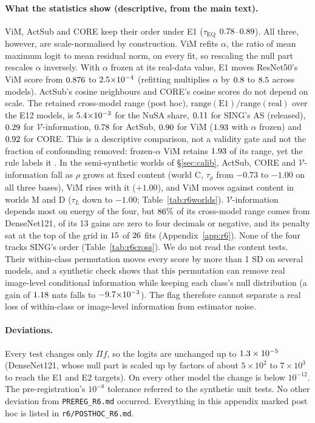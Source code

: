 \documentclass[10pt]{article}
\begin{document}
\paragraph{What the statistics show (descriptive, from the main text).}
ViM, ActSub and CORE keep their order under E1 ($\tau_{\mathrm{EQ}}$ $0.78$--$0.89$). All three, however, are scale-normalised by construction. ViM refits $\alpha$, the ratio of mean maximum logit to mean residual norm, on every fit, so rescaling the null part rescales $\alpha$ inversely. With $\alpha$ frozen at its real-data value, E1 moves ResNet50's ViM score from $0.876$ to $2.5{\times}10^{-4}$ (refitting multiplies $\alpha$ by $0.8$ to $8.5$ across models). ActSub's cosine neighbours and CORE's cosine scores do not depend on scale. The retained cross-model range (post hoc), $\mathrm{range}(\mathrm{E1})/\mathrm{range}(\mathrm{real})$ over the E12 models, is $5.4{\times}10^{-3}$ for the NuSA share, $0.11$ for SING's AS (released), $0.29$ for $\mathcal{V}$-information, $0.78$ for ActSub, $0.90$ for ViM ($1.93$ with $\alpha$ frozen) and $0.92$ for CORE. This is a descriptive comparison, not a validity gate and not the fraction of confounding removed: frozen-$\alpha$ ViM retains $1.93$ of its range, yet the rule labels it \RPVimFrVerdict. In the semi-synthetic worlds of \S\ref{sec:calib}, ActSub, CORE and $\mathcal{V}$-information fall as $\rho$ grows at fixed content (world C, $\tau_\rho$ from $-0.73$ to $-1.00$ on all three bases), ViM rises with it ($+1.00$), and ViM moves against content in worlds M and D ($\tau_L$ down to $-1.00$; Table~\ref{tab:r6worlds}). $\mathcal{V}$-information depends most on energy of the four, but $86\%$ of its cross-model range comes from DenseNet121, \RPVinfoNonposw{} of its 13 gains are zero to four decimals or negative, and its penalty sat at the top of the grid in $15$ of $26$ fits (Appendix~\ref{app:r6}). None of the four tracks SING's order (Table~\ref{tab:r6cross}). We do not read the content tests. Their within-class permutation moves every score by more than 1 SD on several models, and a synthetic check shows that this permutation can remove real image-level conditional information while keeping each class's null distribution (a gain of $1.18$ nats falls to $-9.7{\times}10^{-3}$). The flag therefore cannot separate a real loss of within-class or image-level information from estimator noise.

\paragraph{Deviations.} Every test changes only $\Pi f$, so the logits are unchanged up to $1.3\times10^{-5}$ (DenseNet121, whose null part is scaled up by factors of about $5{\times}10^{2}$ to $7{\times}10^{3}$ to reach the E1 and E2 targets). On every other model the change is below $10^{-12}$. The pre-registration's $10^{-8}$ tolerance referred to the synthetic unit tests. No other deviation from \texttt{PREREG\_R6.md} occurred. Everything in this appendix marked post hoc is listed in \texttt{r6/POSTHOC\_R6.md}.
\end{document}
